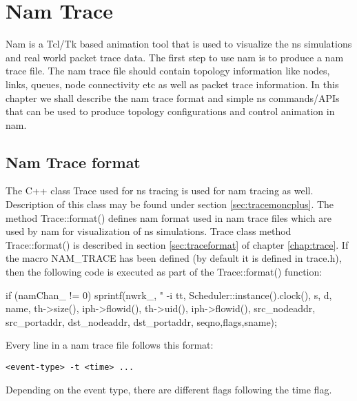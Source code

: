 \chapter{Nam Trace}
\label{chap:namtrace}

Nam is a Tcl/Tk based animation tool that is used to visualize the ns
simulations and real world packet trace data. The first step to use nam is
to produce a nam trace file. The nam trace file should contain topology
information like nodes, links, queues, node connectivity etc as well as
packet trace information. In this chapter we shall describe the nam trace
format and simple ns commands/APIs that can be used to produce topology 
configurations and control animation in nam.

\section{Nam Trace format}
\label{sec:namtraceformat}
The C++ class Trace used for ns tracing is used for nam tracing as
well. Description of this class may be found under section
\ref{sec:tracemoncplus}. The method Trace::format() defines nam 
format used in nam trace files which are used by nam for
visualization of ns simulations. Trace class method Trace::format() is
described in section \ref{sec:traceformat} of chapter \ref{chap:trace}. If
the macro NAM\_TRACE has been defined (by default it is defined in
trace.h), then the following code is executed as part of the
Trace::format() function:

\begin{program}
        if (namChan_ != 0)
                sprintf(nwrk_,
                        "%
-i %
                        tt,
                        Scheduler::instance().clock(),
                        s,
                        d,
                        name,
                        th->size(),
                        iph->flowid(),
                        th->uid(),
                        iph->flowid(),
                        src_nodeaddr,
                        src_portaddr,
                        dst_nodeaddr,
                        dst_portaddr,
                        seqno,flags,sname);
\end{program}

Every line in a nam trace file follows this format:
\begin{verbatim}
<event-type> -t <time> ...
\end{verbatim}
Depending on the event type, there are different flags following the
time flag. 

